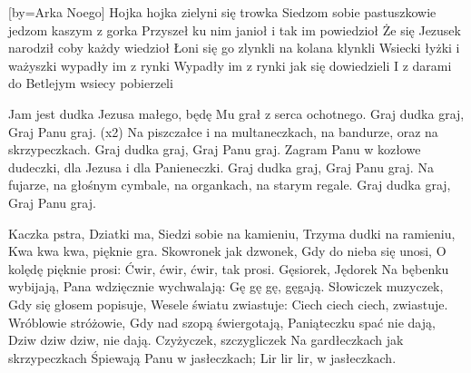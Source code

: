 


[by={Arka Noego}]
\beginverse
Hojka hojka \lrep zielyni się trowka \rrep {}
Siedzom sobie pastuszkowie jedzom kaszym z gorka 
Przyszeł ku nim janioł i tak im powiedzioł
Że się Jezusek narodził coby każdy wiedzioł 
Łoni się go zlynkli na kolana klynkli
Wsiecki łyżki i ważyszki wypadły im z rynki 
Wypadły im z rynki jak się dowiedzieli
I z darami do Betlejym wsiecy pobierzeli  
\endverse
\endsong


\beginverse
Jam jest dudka Jezusa małego,
będę Mu grał z serca ochotnego.
Graj dudka graj, Graj Panu graj. (x2)
\endverse
\beginverse
Na piszczałce i na multaneczkach,
na bandurze, oraz na skrzypeczkach.
Graj dudka graj, Graj Panu graj.
\endverse
\beginverse
Zagram Panu w kozłowe dudeczki,
dla Jezusa i dla Panieneczki.
Graj dudka graj, Graj Panu graj.
\endverse
\beginverse
Na fujarze, na głośnym cymbale,
na organkach, na starym regale.
Graj dudka graj, Graj Panu graj.
\endverse
\endsong


\beginverse
    Kaczka pstra, Dziatki ma,
\endverse
\beginchorus
    Siedzi sobie na kamieniu,
    Trzyma dudki na ramieniu,
    Kwa kwa kwa, pięknie gra.
\endchorus
\beginverse
    Skowronek jak dzwonek,
\endverse
\beginchorus
    Gdy do nieba się unosi,
    O kolędę pięknie prosi:
    Ćwir, ćwir, ćwir, tak prosi.
\endchorus
\beginverse
    Gęsiorek, Jędorek
\endverse
\beginchorus
    Na bębenku wybijają,
    Pana wdzięcznie wychwalają:
    Gę gę gę, gęgają.
\endchorus
\beginverse
    Słowiczek muzyczek,
\endverse
\beginchorus
    Gdy się głosem popisuje,
    Wesele światu zwiastuje:
    Ciech ciech ciech, zwiastuje.
\endchorus
\beginverse
    Wróblowie stróżowie,
\endverse
\beginchorus
    Gdy nad szopą świergotają,
    Paniąteczku spać nie dają,
    Dziw dziw dziw, nie dają.
\endchorus
\beginverse
    Czyżyczek, szczygliczek
\endverse
\beginchorus
    Na gardłeczkach jak skrzypeczkach
    Śpiewają Panu w jasłeczkach;
    Lir lir lir, w jasłeczkach.
\endchorus
\endsong
